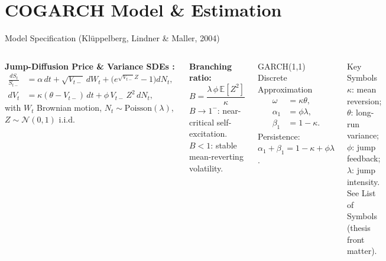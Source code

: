 \documentclass[10pt, aspectratio=169]{beamer}
\begin{document}
\section{COGARCH Model \& Estimation}

\begin{frame}{Model Specification (Kl\"uppelberg, Lindner \& Maller, 2004)}
\begin{columns}[T]
  \textbf{Jump-Diffusion Price \& Variance SDEs \cite{kluppelberg2004continuous}:}
  \begin{align*}
    \frac{dS_t}{S_{t-}} &= \alpha\,dt + \sqrt{V_{t-}}\,dW_t
      + \bigl(e^{\sqrt{V_{t-}}Z}-1\bigr)dN_t,\\
    dV_t &= \kappa(\theta-V_{t-})\,dt + \phi\,V_{t-}\,Z^2\,dN_t,
  \end{align*}
  with $W_t$ Brownian motion, $N_t\sim\text{Poisson}(\lambda)$,
  $Z\sim\mathcal{N}(0,1)$ i.i.d.

  \medskip
  \textbf{Branching ratio:}
  \[
    B = \frac{\lambda\,\phi\,\mathbb{E}[Z^2]}{\kappa}
  \]
  $B\to 1^-$: near-critical self-excitation.
  $B<1$: stable mean-reverting volatility.
  \begin{block}{GARCH(1,1) Discrete Approximation}
    \begin{align*}
      \omega &= \kappa\theta, \\
      \alpha_1 &= \phi\lambda, \\
      \beta_1 &= 1-\kappa.
    \end{align*}
    Persistence: $\alpha_1 + \beta_1 = 1 - \kappa + \phi\lambda$.
  \end{block}
  \vspace{0.2cm}
  \begin{block}{Key Symbols}
    $\kappa$: mean reversion; $\theta$: long-run variance;
    $\phi$: jump feedback; $\lambda$: jump intensity.
    See List of Symbols (thesis front matter).
  \end{block}
\end{columns}
\end{frame}
\end{document}
